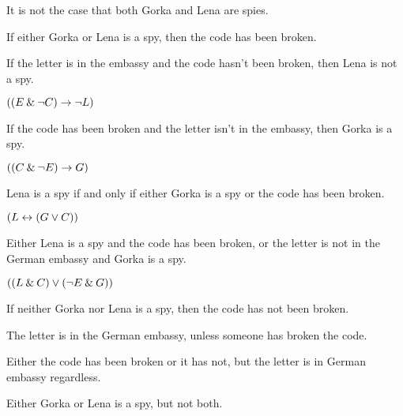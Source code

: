 \problempart
\label{pr.spies}
\begin{earg}
\item It is not the case that both Gorka and Lena are spies.
\item[] \smallskip

\item If either Gorka or Lena is a spy, then the code has been broken.
\item[] \smallskip

\item If the letter is in the embassy and the code hasn't been broken, then Lena is not a spy.
\item[] $((E \mathbin{\&} {\neg} C) \rightarrow {\neg} L)$\smallskip

\item If the code has been broken and the letter isn't in the embassy, then Gorka is a spy.
\item[] $((C \mathbin{\&} {\neg} E) \rightarrow G)$\smallskip

\item Lena is a spy if and only if either Gorka is a spy or the code has been broken.
\item[] $(L \leftrightarrow (G \vee C))$\smallskip

\item Either Lena is a spy and the code has been broken, or the letter is not in the German embassy and Gorka is a spy.
\item[] $((L \mathbin{\&} C) \vee ({\neg} E \mathbin{\&} G))$\smallskip


\item If neither Gorka nor Lena is a spy, then the code has not been broken.
\item[] \smallskip

\item The letter is in the German embassy, unless someone has broken the code.
\item[] \smallskip

\noindent\begin{minipage}{0.88\textwidth}
\item Either the code has been broken or it has not, but the letter is in German embassy regardless.
\item[] \medskip
\end{minipage}

\item Either Gorka or Lena is a spy, but not both.
\item[] 
\end{earg}




